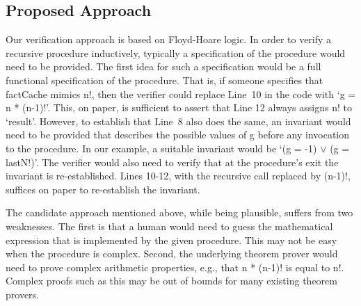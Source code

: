 \subsection{Proposed Approach}
\label{ssec:intro:approach}
%
%
%
Our verification approach is based on Floyd-Hoare logic. In order to verify
a recursive procedure inductively, typically a specification of the
procedure would need to be provided. The first idea for such a
specification would be a full functional specification of the
procedure. That is, if someone specifies that factCache mimics n!, then the
verifier could replace Line~10 in the code with `g = n * (n-1)!'. This, on
paper, is sufficient to assert that Line 12 always assigns n! to
`result'. However, to establish that Line~8 also does the same, an invariant
would need to be provided that describes the possible values of g before
any invocation to the procedure. In our example, a suitable invariant would
be `(g = -1) $\vee$ (g = lastN!)'. The verifier would also need to verify
that at the procedure's exit the invariant is re-established. Lines 10-12,
with the recursive call replaced by (n-1)!, suffices on paper to
re-establish the invariant.

The candidate approach mentioned above, while being plausible, suffers from
two weaknesses. The first is that a human would need to guess the
mathematical expression that is implemented by the given procedure. This may not be
easy when the procedure is complex. Second, the underlying theorem prover
would need to prove complex arithmetic properties, e.g., that n * (n-1)! is
equal to n!. Complex proofs such as this may be out of bounds for many
existing theorem provers.

